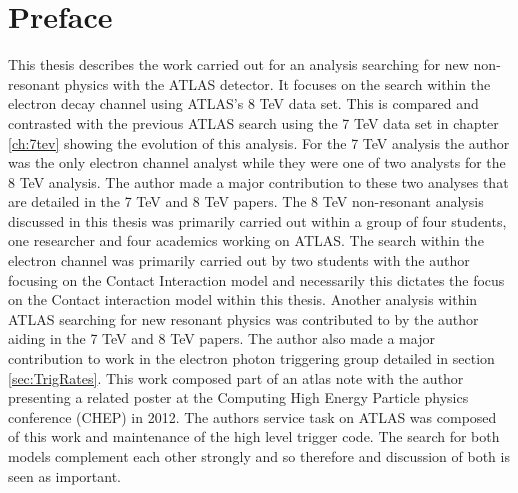 \chapter*{Preface}

This thesis describes the work carried out for an analysis searching for new non-resonant physics with the ATLAS detector. It focuses on the search within the electron decay channel using ATLAS's 8 TeV data set. This is compared and contrasted with the previous ATLAS search using the 7 TeV data set in chapter \ref{ch:7tev} showing the evolution of this analysis. For the 7 TeV analysis the author was the only electron channel analyst while they were one of two analysts for the 8 TeV analysis. The author made a major contribution to these two analyses that are detailed in the 7 TeV \cite{PhysRevD.87.015010} and 8 TeV \cite{} papers.
The 8 TeV non-resonant analysis discussed in this thesis was primarily carried out within a group of four students, one researcher and four academics working on ATLAS. The search within the electron channel was primarily carried out by two students with the author focusing on the Contact Interaction model and necessarily this dictates the focus on the Contact interaction model within this thesis. 
Another analysis within ATLAS searching for new resonant physics was contributed to by the author aiding in the 7 TeV \cite{} and 8 TeV \cite{} papers. 
The author also made a major contribution to work in the electron photon triggering group detailed in section \ref{sec:TrigRates}. This work composed part of an atlas note \cite{} with the author presenting a related poster at the Computing High Energy Particle physics conference (CHEP) in 2012. 
The authors service task on ATLAS was composed of this work and maintenance of the high level trigger code.
The search for both models complement each other strongly and so therefore and discussion of both is seen as important. 






